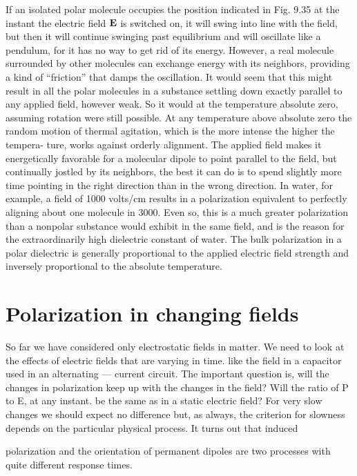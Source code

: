 If an isolated polar molecule occupies the position indicated in
Fig. 9.35 at the instant the electric field $\mathbf{E}$ is switched on, it will swing
into line with the field, but then it will continue swinging past equilibrium
and will oscillate like a pendulum, for it has no way to get
rid of its energy. However, a real molecule surrounded by other
molecules can exchange energy with its neighbors, providing a kind
of ``friction'' that damps the oscillation. It would seem that this
might result in all the polar molecules in a substance settling down
exactly parallel to any applied field, however weak. So it would at
the temperature absolute zero, assuming rotation were still possible.
At any temperature above absolute zero the random motion of
thermal agitation, which is the more intense the higher the tempera-
ture, works against orderly alignment. The applied field makes it
energetically favorable for a molecular dipole to point parallel to
the field, but continually jostled by its neighbors, the best it can do
is to spend slightly more time pointing in the right direction than in
the wrong direction. In water, for example, a field of 1000 volts/cm
results in a polarization equivalent to perfectly aligning about one
molecule in 3000. Even so, this is a much greater polarization than
a nonpolar substance would exhibit in the same field, and is the
reason for the extraordinarily high dielectric constant of water. The
bulk polarization in a polar dielectric is generally proportional to
the applied electric field strength and inversely proportional to the
absolute temperature.

\iffalse

\section{Polarization in changing fields}

So far we have considered only electrostatic fields in matter. We
need to look at the effects of electric fields that are varying in time.
like the field in a capacitor used in an alternating --- current circuit.
The important question is, will the changes in polarization keep up
with the changes in the field? Will the ratio of P to E, at any instant.
be the same as in a static electric field? For very slow changes we
should expect no difference but, as always, the criterion for slowness
depends on the particular physical process. It turns out that induced

polarization and the orientation of permanent dipoles are two
processes with quite different response times.


